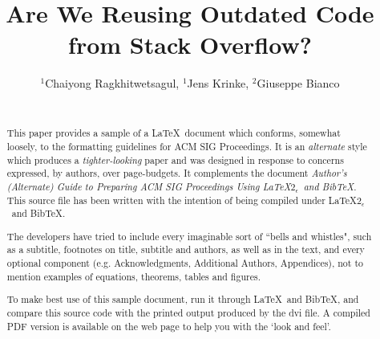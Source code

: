 \documentclass{sig-alternate-05-2015}
\begin{document}






%

\title{Are We Reusing Outdated Code from Stack Overflow?}

\author{
	\alignauthor
	$^1$Chaiyong Ragkhitwetsagul, $^1$Jens Krinke, $^2$Giuseppe Bianco \\
	\\
}


\maketitle
\begin{abstract}
This paper provides a sample of a \LaTeX\ document which conforms,
somewhat loosely, to the formatting guidelines for
ACM SIG Proceedings. It is an {\em alternate} style which produces
a {\em tighter-looking} paper and was designed in response to
concerns expressed, by authors, over page-budgets.
It complements the document \textit{Author's (Alternate) Guide to
Preparing ACM SIG Proceedings Using \LaTeX$2_\epsilon$\ and Bib\TeX}.
This source file has been written with the intention of being
compiled under \LaTeX$2_\epsilon$\ and BibTeX.

The developers have tried to include every imaginable sort
of ``bells and whistles", such as a subtitle, footnotes on
title, subtitle and authors, as well as in the text, and
every optional component (e.g. Acknowledgments, Additional
Authors, Appendices), not to mention examples of
equations, theorems, tables and figures.

To make best use of this sample document, run it through \LaTeX\
and BibTeX, and compare this source code with the printed
output produced by the dvi file. A compiled PDF version
is available on the web page to help you with the
`look and feel'.
\end{abstract}
\end{document}
